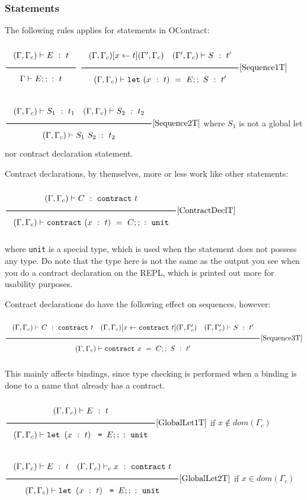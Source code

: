 \documentclass[a4paper]{article}
\newcommand{\Rule}[2]{\genfrac{}{}{0.7pt}{}{{\setlength{\fboxrule}{0pt}\setlength{\fboxsep}{3mm}\fbox{$#1$}}}{{\setlength{\fboxrule}{0pt}\setlength{\fboxsep}{3mm}\fbox{$#2$}}}}
\newcommand{\RuleWithName}[3]{\genfrac{}{}{0.7pt}{}{{\setlength{\fboxrule}{0pt}\setlength{\fboxsep}{3mm}\fbox{$#1$}}}{{\setlength{\fboxrule}{0pt}\setlength{\fboxsep}{3mm}\fbox{$#2$}}}[\text{#3}]}
\begin{document}
\subsubsection{Statements}

The following rules applies for statements in OContract:

$\Rule{(\Gamma, \Gamma_c) \vdash E\ :\ t}{\Gamma \vdash E;;\ :\ t}$
\hfill
$\RuleWithName{(\Gamma, \Gamma_c)[x\leftarrow t](\Gamma', \Gamma_c)\quad(\Gamma', \Gamma_c) \vdash S\ :\ t'}{(\Gamma, \Gamma_c) \vdash \texttt{let}\ (x\ :\ t)\ =\ E;;\ S\ :\ t'}{Sequence1T}$
\begin{center}
    $\RuleWithName{(\Gamma, \Gamma_c) \vdash S_1\ :\ t_1\quad (\Gamma, \Gamma_c)\vdash S_2\ :\ t_2}{(\Gamma, \Gamma_c) \vdash S_1\ S_2\ :\ t_2}{Sequence2T}$
    where $S_1$ is not a global let nor contract declaration statement.
\end{center}

Contract declarations, by themselves, more or less work like other statements:

\begin{center}
    $\RuleWithName{(\Gamma, \Gamma_c) \vdash C\ :\ \texttt{contract}\ t}{(\Gamma, \Gamma_c) \vdash \texttt{contract}\ (x\ :\ t)\ =\ C;;\ :\ \texttt{unit}}{ContractDeclT}$
\end{center}

where \verb|unit| is a special type, which is used when the statement does not possess any type.
Do note that the type here is not the same as the output you see when you do a contract declaration on the REPL, which is printed out more for usability purposes.

Contract declarations do have the following effect on sequences, however:

\begin{center}
    $\RuleWithName{(\Gamma, \Gamma_c)\vdash C\ :\ \texttt{contract}\ t\quad (\Gamma, \Gamma_c)[x\leftarrow \texttt{contract}\ t](\Gamma, \Gamma_c')\quad(\Gamma, \Gamma_c') \vdash S\ :\ t'}{(\Gamma, \Gamma_c)\vdash \texttt{contract}\ x\ =\ C;;\ S\ :\ t'}{Sequence3T}$
\end{center}

This mainly affects bindings, since type checking is performed when a binding is done to a name that already has a contract.

\begin{center}
    $\RuleWithName{(\Gamma, \Gamma_c) \vdash E\ :\ t}{(\Gamma, \Gamma_c) \vdash \texttt{let } (x\ :\ t)\ \texttt{ = } E;;\ :\ \texttt{unit}}{GlobalLet1T}$
    if $x \notin dom(\Gamma_c)$

    $\RuleWithName{(\Gamma, \Gamma_c) \vdash E\ :\ t\quad (\Gamma, \Gamma_c)\vdash_c x\ :\ \texttt{contract}\ t}{(\Gamma, \Gamma_c) \vdash \texttt{let } (x\ :\ t)\ \texttt{ = } E;;\ :\ \texttt{unit}}{GlobalLet2T}$
    if $x \in dom(\Gamma_c)$
\end{center}
\end{document}
